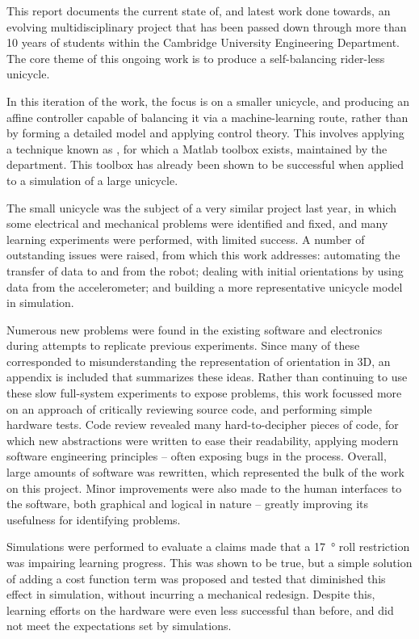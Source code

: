 \documentclass[main.tex]{subfiles}
\begin{document}
This report documents the current state of, and latest work done towards, an evolving multidisciplinary project that has been passed down through more than 10 years of students within the Cambridge University Engineering Department. The core theme of this ongoing work is to produce a self-balancing rider-less unicycle.

In this iteration of the work, the focus is on a smaller unicycle, and producing an affine controller capable of balancing it via a machine-learning route, rather than by forming a detailed model and applying control theory. This involves applying a technique known as {\Pilco}, for which a Matlab toolbox exists, maintained by the department. This toolbox has already been shown to be successful when applied to a simulation of a large unicycle.

The small unicycle was the subject of a very similar project last year, in which some electrical and mechanical problems were identified and fixed, and many learning experiments were performed, with limited success.
A number of outstanding issues were raised, from which this work addresses:
automating the transfer of data to and from the robot;
dealing with initial orientations by using data from the accelerometer;
and building a more representative unicycle model in simulation.

Numerous new problems were found in the existing software and electronics during attempts to replicate previous experiments.
Since many of these corresponded to misunderstanding the representation of orientation in 3D, an appendix is included that summarizes these ideas.
Rather than continuing to use these slow full-system experiments to expose problems, this work focussed more on an approach of critically reviewing source code, and performing simple hardware tests.
Code review revealed many hard-to-decipher pieces of code, for which new abstractions were written to ease their readability, applying modern software engineering principles -- often exposing bugs in the process.
Overall, large amounts of software was rewritten, which represented the bulk of the work on this project.
Minor improvements were also made to the human interfaces to the software, both graphical and logical in nature -- greatly improving its usefulness for identifying problems.

Simulations were performed to evaluate a claims made that a \SI{17}{\degree} roll restriction was impairing learning progress. This was shown to be true, but a simple solution of adding a cost function term was proposed and tested that diminished this effect in simulation, without incurring a mechanical redesign.
Despite this, learning efforts on the hardware were even less successful than before, and did not meet the expectations set by simulations.
\end{document}
